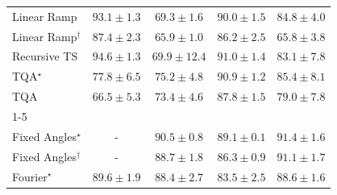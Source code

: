 \begin{tabular}{l|cccc|}
Linear Ramp & {\cellcolor[HTML]{842E05}} \color[HTML]{F1F1F1} $93.1\pm 1.3$ & {\cellcolor[HTML]{FFF7BE}} \color[HTML]{000000} $69.3\pm 1.6$ & {\cellcolor[HTML]{AE3E03}} \color[HTML]{F1F1F1} $90.0\pm 1.5$ & {\cellcolor[HTML]{E76B11}} \color[HTML]{F1F1F1} $84.8\pm 4.0$ \\
Linear Ramp$^\dagger$ & {\cellcolor[HTML]{D05104}} \color[HTML]{F1F1F1} $87.4\pm 2.3$ & {\cellcolor[HTML]{FFFFE5}} \color[HTML]{000000} $65.9\pm 1.0$ & {\cellcolor[HTML]{DA5C0A}} \color[HTML]{F1F1F1} $86.2\pm 2.5$ & {\cellcolor[HTML]{FFFFE5}} \color[HTML]{000000} $65.8\pm 3.8$ \\
Recursive TS & {\cellcolor[HTML]{702806}} \color[HTML]{F1F1F1} $94.6\pm 1.3$ & {\cellcolor[HTML]{FFF5B8}} \color[HTML]{000000} $69.9\pm 12.4$ & {\cellcolor[HTML]{A13804}} \color[HTML]{F1F1F1} $91.0\pm 1.4$ & {\cellcolor[HTML]{F17C1A}} \color[HTML]{F1F1F1} $83.1\pm 7.8$ \\
TQA$^\star$ & {\cellcolor[HTML]{FEB945}} \color[HTML]{000000} $77.8\pm 6.5$ & {\cellcolor[HTML]{FED26D}} \color[HTML]{000000} $75.2\pm 4.8$ & {\cellcolor[HTML]{A33904}} \color[HTML]{F1F1F1} $90.9\pm 1.2$ & {\cellcolor[HTML]{E1640E}} \color[HTML]{F1F1F1} $85.4\pm 8.1$ \\
TQA & {\cellcolor[HTML]{FFFDDD}} \color[HTML]{000000} $66.5\pm 5.3$ & {\cellcolor[HTML]{FEE28E}} \color[HTML]{000000} $73.4\pm 4.6$ & {\cellcolor[HTML]{CD4D03}} \color[HTML]{F1F1F1} $87.8\pm 1.5$ & {\cellcolor[HTML]{FEAB39}} \color[HTML]{000000} $79.0\pm 7.8$ \\
\cline{1-5}
\multicolumn{5}{c}{\rule{0pt}{8pt}PP} \\
\midrule
Fixed Angles$^\star$ & {\cellcolor[HTML]{000000}} \color[HTML]{F1F1F1} {\cellcolor{white}} \color{black} - & {\cellcolor[HTML]{0A703A}} \color[HTML]{F1F1F1} $90.5\pm 0.8$ & {\cellcolor[HTML]{177B3F}} \color[HTML]{F1F1F1} $89.1\pm 0.1$ & {\cellcolor[HTML]{016937}} \color[HTML]{F1F1F1} $91.4\pm 1.6$ \\
Fixed Angles$^\dagger$ & {\cellcolor[HTML]{000000}} \color[HTML]{F1F1F1} {\cellcolor{white}} \color{black} - & {\cellcolor[HTML]{1C7E40}} \color[HTML]{F1F1F1} $88.7\pm 1.8$ & {\cellcolor[HTML]{30954F}} \color[HTML]{F1F1F1} $86.3\pm 0.9$ & {\cellcolor[HTML]{056C39}} \color[HTML]{F1F1F1} $91.1\pm 1.7$ \\
Fourier$^\star$ & {\cellcolor[HTML]{13773D}} \color[HTML]{F1F1F1} $89.6\pm 1.9$ & {\cellcolor[HTML]{1E8041}} \color[HTML]{F1F1F1} $88.4\pm 2.7$ & {\cellcolor[HTML]{4CB063}} \color[HTML]{F1F1F1} $83.5\pm 2.5$ & {\cellcolor[HTML]{1D7F41}} \color[HTML]{F1F1F1} $88.6\pm 1.6$ \\

\end{tabular}
